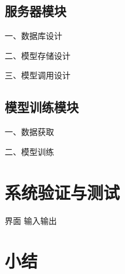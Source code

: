 \subsection{服务器模块}

一、数据库设计

二、模型存储设计

三、模型调用设计

\subsection{模型训练模块}
一、数据获取

二、模型训练

\section{系统验证与测试}
界面
输入输出
\section{小结}